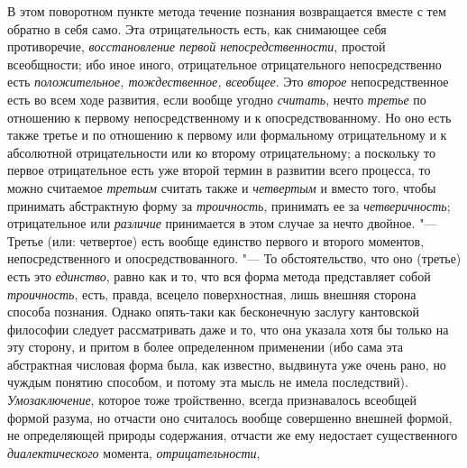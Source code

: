 В этом поворотном пункте метода течение познания возвращается
вместе с тем обратно в себя само. Эта отрицательность есть, как снимающее
себя противоречие, {\em восстановление
первой непосредственности}, простой всеобщности; ибо иное
иного, отрицательное отрицательного непосредственно есть
{\em положительное, тождественное, всеобщее}. Это {\em второе}
непосредственное есть во всем ходе развития, если вообще угодно {\em считать},
нечто {\em третье} по отношению к первому непосредственному и к
опосредствованному. Но оно есть также третье и по отношению к первому или
формальному отрицательному и к абсолютной отрицательности или ко второму
отрицательному; а поскольку то первое отрицательное есть уже второй термин
в развитии всего процесса, то можно считаемое {\em третьим} считать
также и {\em четвертым} и вместо того, чтобы принимать абстрактную форму за
{\em троичность}, принимать ее за {\em четверичность}; отрицательное или
{\em различие} принимается в этом случае за нечто двойное. "---
Третье (или: четвертое) есть вообще единство первого и
второго моментов, непосредственного и опосредствованного. "---
То обстоятельство, что оно (третье) есть это {\em единство}, равно как
и то, что вся форма метода представляет собой {\em троичность}, есть,
правда, всецело поверхностная, лишь внешняя сторона способа познания.
Однако опять-таки как бесконечную заслугу кантовской
философии
следует рассматривать даже и то, что она указала хотя бы
только на эту сторону, и притом в более определенном применении (ибо сама
эта абстрактная числовая форма была, как известно, выдвинута уже очень
рано, но чуждым понятию способом, и потому эта мысль не имела последствий).
{\em Умозаключение}, которое тоже тройственно, всегда признавалось всеобщей
формой разума, но отчасти оно считалось вообще совершенно внешней формой, не
определяющей природы содержания, отчасти же ему недостает существенного
{\em диалектического} момента, {\em отрицательности},
